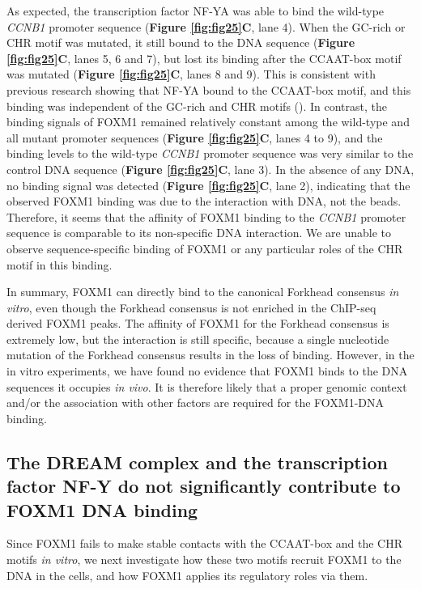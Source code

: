 As expected, the transcription factor NF-YA was able to bind the wild-type \textit{CCNB1} promoter sequence (\textbf{Figure \ref{fig:fig25}C}, lane 4). When the GC-rich or CHR motif was mutated, it still bound to the DNA sequence (\textbf{Figure \ref{fig:fig25}C}, lanes 5, 6 and 7), but lost its binding after the CCAAT-box motif was mutated (\textbf{Figure \ref{fig:fig25}C}, lanes 8 and 9). This is consistent with previous research showing that NF-YA bound to the CCAAT-box motif, and this binding was independent of the GC-rich and CHR motifs (\cite{müller2012the}). In contrast, the binding signals of FOXM1 remained relatively constant among the wild-type and all mutant promoter sequences (\textbf{Figure \ref{fig:fig25}C}, lanes 4 to 9), and the binding levels to the wild-type \textit{CCNB1} promoter sequence was very similar to the control DNA sequence (\textbf{Figure \ref{fig:fig25}C}, lane 3). In the absence of any DNA, no binding signal was detected (\textbf{Figure \ref{fig:fig25}C}, lane 2), indicating that the observed FOXM1 binding was due to the interaction with DNA, not the beads. Therefore, it seems that the affinity of FOXM1 binding to the \textit{CCNB1} promoter sequence is comparable to its non-specific DNA interaction. We are unable to observe sequence-specific binding of FOXM1 or any particular roles of the CHR motif in this binding.

In summary, FOXM1 can directly bind to the canonical Forkhead consensus \textit{in vitro}, even though the Forkhead consensus is not enriched in the ChIP-seq derived FOXM1 peaks. The affinity of FOXM1 for the Forkhead consensus is extremely low, but the interaction is still specific, because a single nucleotide mutation of the Forkhead consensus results in the loss of binding. However, in the in vitro experiments, we have found no evidence that FOXM1 binds to the DNA sequences it occupies \textit{in vivo}. It is therefore likely that a proper genomic context and/or the association with other factors are required for the FOXM1-DNA binding.

\subsection{The DREAM complex and the transcription factor NF-Y do not significantly contribute to FOXM1 DNA binding}

Since FOXM1 fails to make stable contacts with the CCAAT-box and the CHR motifs \textit{in vitro}, we next investigate how these two motifs recruit FOXM1 to the DNA in the cells, and how FOXM1 applies its regulatory roles via them.

